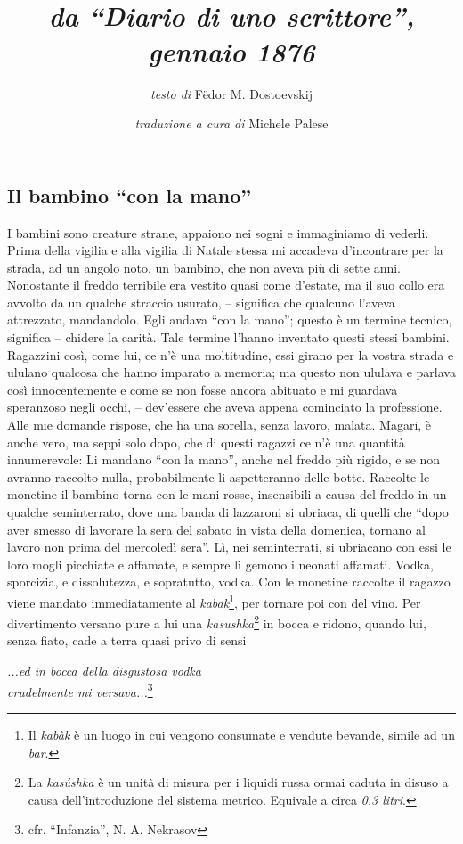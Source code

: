 \documentclass[a4paper, 12pt]{article}
\title{
	\MyTitle\\
	\large\textit{da ``Diario di uno scrittore'', gennaio 1876}
}
\author{\textit{testo di} Fëdor M. Dostoevskij \and \textit{traduzione a cura di} Michele Palese}
\date{}
\begin{document}
	
	\maketitle
	\break
	
	\resetlinenumber
\begin{linenumbers}
	
	\section{Il bambino ``con la mano''}
	
	I bambini sono creature strane, appaiono nei sogni e immaginiamo di vederli. %
	Prima della vigilia e alla vigilia di Natale stessa mi accadeva d'incontrare per la strada, ad un angolo noto, un bambino, che non aveva più di sette anni.
	Nonostante il freddo terribile era vestito quasi come d'estate, ma il suo collo era avvolto da un qualche straccio usurato, -- significa che qualcuno l'aveva attrezzato, mandandolo.
	Egli andava ``con la mano''; questo è un termine tecnico, significa -- chidere la carità.
	Tale termine l'hanno inventato questi stessi bambini.
	Ragazzini così, come lui, ce n'è una moltitudine, essi girano per la vostra strada e ululano qualcosa che hanno imparato a memoria; ma questo non ululava e parlava così innocentemente e come se non fosse ancora abituato e mi guardava speranzoso negli occhi, -- dev'essere che aveva appena cominciato la professione.
	Alle mie domande rispose, che ha una sorella, senza lavoro, malata.
	Magari, è anche vero, ma seppi solo dopo, che di questi ragazzi ce n'è una quantità innumerevole:
	Li mandano ``con la mano'', anche nel freddo più rigido, e se non avranno raccolto nulla, probabilmente li aspetteranno delle botte.
	Raccolte le monetine il bambino torna con le mani rosse, insensibili a causa del freddo in un qualche seminterrato, dove una banda di lazzaroni si ubriaca, di quelli che ``dopo aver smesso di lavorare la sera del sabato in vista della domenica, tornano al lavoro non prima del mercoledì sera''.
	Lì, nei seminterrati, si ubriacano con essi le loro mogli picchiate e affamate, e sempre lì gemono i neonati affamati.
	Vodka, sporcizia, e dissolutezza, e sopratutto, vodka.
	Con le monetine raccolte il ragazzo viene mandato immediatamente al \textit{kabak}\footnote{Il \textit{kabàk} è un luogo in cui vengono consumate e vendute bevande, simile ad un \textit{bar}.}, per tornare poi con del vino.
	Per divertimento versano pure a lui una \textit{kasushka}\footnote{La \textit{kasúshka} è un unità di misura per i liquidi russa ormai caduta in disuso a causa dell'introduzione del sistema metrico. Equivale a circa \textit{0.3 litri}.} in bocca e ridono, quando lui, senza fiato, cade a terra quasi privo di sensi
	\begin{center}\textit{
		...ed in bocca della disgustosa vodka\\
		crudelmente mi versava...}\footnote{cfr. ``Infanzia'', N. A. Nekrasov}
	\end{center}
	

\end{linenumbers}
\end{document}
